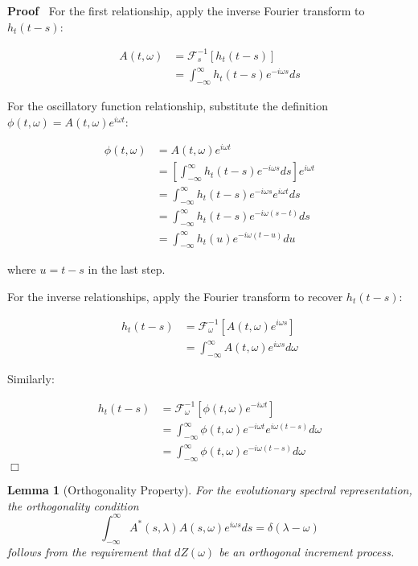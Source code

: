 \documentclass{article}
\newenvironment{proof}{\noindent\textbf{Proof\ }}{\hspace*{\fill}$\Box$\medskip}
\newtheorem{lemma}{Lemma}
\begin{document}
\begin{proof}
  For the first relationship, apply the inverse Fourier transform to $h_t  (t
  - s)$:
  
  \begin{align}
    A (t, \omega) & =\mathcal{F}_s^{- 1}  [h_t (t - s)] \\
    & = \int_{- \infty}^{\infty} h_t  (t - s) e^{- i \omega s} ds 
  \end{align}
  
  For the oscillatory function relationship, substitute the definition $\phi
  (t, \omega) = A (t, \omega) e^{i \omega t}$:
  
  \begin{align}
    \phi (t, \omega) & = A (t, \omega) e^{i \omega t} \\
    & = \left[ \int_{- \infty}^{\infty} h_t (t - s) e^{- i \omega s} ds
    \right] e^{i \omega t} \\
    & = \int_{- \infty}^{\infty} h_t  (t - s) e^{- i \omega s} e^{i \omega t}
    ds \\
    & = \int_{- \infty}^{\infty} h_t  (t - s) e^{- i \omega (s - t)} ds \\
    & = \int_{- \infty}^{\infty} h_t (u) e^{- i \omega (t - u)} du 
  \end{align}
  
  where $u = t - s$ in the last step.
  
  For the inverse relationships, apply the Fourier transform to recover $h_t 
  (t - s)$:
  
  \begin{align}
    h_t  (t - s) & =\mathcal{F}_{\omega}^{- 1}  [A (t, \omega) e^{i \omega s}]
    \\
    & = \int_{- \infty}^{\infty} A (t, \omega) e^{i \omega s} d \omega 
  \end{align}
  
  Similarly:
  
  \begin{align}
    h_t  (t - s) & =\mathcal{F}_{\omega}^{- 1}  [\phi (t, \omega) e^{- i
    \omega t}] \\
    & = \int_{- \infty}^{\infty} \phi (t, \omega) e^{- i \omega t} e^{i
    \omega (t - s)} d \omega \\
    & = \int_{- \infty}^{\infty} \phi (t, \omega) e^{- i \omega (t - s)} d
    \omega 
  \end{align}
\end{proof}

\begin{lemma}
  [Orthogonality Property] For the evolutionary spectral representation, the
  orthogonality condition
  \begin{equation}
    \int_{- \infty}^{\infty} A^{\ast} (s, \lambda) A (s, \omega) e^{i \omega
    s} ds = \delta (\lambda - \omega)
  \end{equation}
  follows from the requirement that $dZ (\omega)$ be an orthogonal increment
  process.
\end{lemma}
\end{document}
